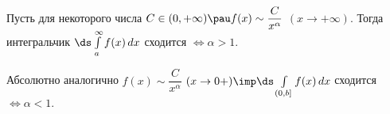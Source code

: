 
    	Пусть для некоторого числа $C\in(0,+\infty)\pau f(x)\sim \dfrac{C}{x^\alpha}$ $(x\to+\infty)$. Тогда интегральчик
    	$\ds\int\limits_a^\infty f(x)\,dx$ сходится $\iff\alpha>1$.
    	
    	Абсолютно аналогично $f(x)\sim\dfrac{C}{x^\alpha}$ $(x\to 0+)\imp\ds\int\limits_{(0,b]}f(x)\,dx$ сходится $\iff\alpha<1.$ 
    